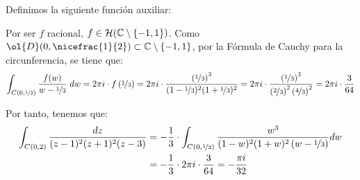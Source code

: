 \begin{ejercicio}
\begin{enumerate}
        Definimos la siguiente función auxiliar:

        Por ser $f$ racional, $f\in \mathcal{H}(\mathbb{C}\setminus \{-1,1\})$. Como $\ol{D}(0,\nicefrac{1}{2})\subset \bb{C}\setminus \{-1,1\}$, por la Fórmula de Cauchy para la circunferencia, se tiene que:
        \begin{equation*}
            \int_{C(0,\nicefrac{1}{2})} \dfrac{f(w)}{w-\nicefrac{1}{3}}\ dw = 2\pi i\cdot f\left(\nicefrac{1}{3}\right) = 2\pi i \cdot \dfrac{\left(\nicefrac{1}{3}\right)^3}{(1-\nicefrac{1}{3})^2(1+\nicefrac{1}{3})^2} = 2\pi i \cdot \dfrac{\left(\nicefrac{1}{3}\right)^3}{\left(\nicefrac{2}{3}\right)^2\left(\nicefrac{4}{3}\right)^2} = 2\pi i \cdot \dfrac{3}{64}
        \end{equation*}

        Por tanto, tenemos que:
        \begin{align*}
            \int_{C(0,2)} \frac{dz}{(z-1)^2(z+1)^2(z-3)} &= -\dfrac{1}{3}\cdot \int_{C(0,\nicefrac{1}{2})}\frac{w^3}{(1-w)^2(1+w)^2\left(w-\nicefrac{1}{3}\right)} dw\\
            &= -\dfrac{1}{3}\cdot 2\pi i \cdot \dfrac{3}{64} = -\dfrac{\pi i}{32}
        \end{align*}
    \end{enumerate}
\end{ejercicio}